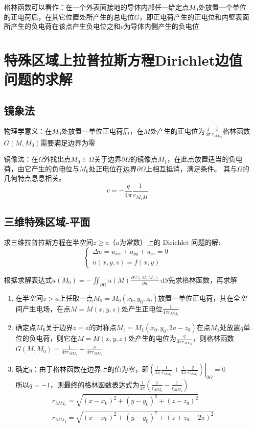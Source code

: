 格林函数可以看作：在一个外表面接地的导体内部任一给定点\(M_0\)处放置一个单位的正电荷后，在其它位置处所产生的总电位\(G\)，即正电荷产生的正电位和内壁表面所产生的负电荷在该点产生负电位之和\(v\)为导体内侧产生的负电位

\section{特殊区域上拉普拉斯方程Dirichlet边值问题的求解}

\subsection{镜象法}

物理学意义：在\(M_0\)处放置一单位正电荷后，在\(M\)处产生的正电位为\(\frac{1}{4\pi}\frac{1}{r_{MM_0}}\)格林函数\(G(M,M_0)\)需要满足边界为零

镜像法：在\(\Omega\)外找出点\(M_0\in\Omega\)关于边界\(\partial\Omega\)的镜像点\(M_1\)，在此点放置适当的负电荷，由它产生的负电位与\(M_0\)处正电位在边界\(\partial\Omega\)上相互抵消，满足条件。 其与\(\Omega\)的几何特点息息相关。
\[
v=-\frac{q}{4\pi}\frac{1}{r_{M_1M}}
\]

\subsection{三维特殊区域-平面}

求三维拉普拉斯方程在半空间\(z\geq a\)（\(a\)为常数）上的 Dirichlet 问题的解:
\[\begin{cases}
\Delta u=u_{xx}+u_{yy}+u_{zz}=0\\
u(x,y,z)=f(x,y)
\end{cases}\]

根据求解表达式\(u(M_0)=-\iint_{\partial\Omega} u(M)\frac{\partial G(M,M_0)}{\partial n}\,\mathrm{d}S\)先求格林函数，再求解
\begin{enumerate}
	\item 在半空间\(z>a\)上任取一点\(M_0=M_0(x_0,y_0,z_0)\)放置一单位正电荷，其在全空间产生电场，在点\(M=M(x,y,z)\)处产生正电位\(\frac{1}{4\pi  r_{MM_0}}\)
	\item 确定点\(M_0\)关于边界\(z=a\)的对称点\(M_1=M_1(x_0,y_0,2a-z_0)\)在点\(M_1\)处放置\(q\)单位的负电荷，则它在\(M=M(x,y,z)\)处产生的电位为\(\frac{q}{4\pi  r_{MM_0}}\)，则格林函数\(G(M,M_0)=\frac{1}{4\pi  r_{MM_0}}+\frac{q}{4\pi  r_{MM_1}}\)
	\item 确定\(q\)：由于格林函数在边界上的值为零，即\(\left.\left(\frac{1}{4\pi}\frac{1}{r_{MM_0}}+\frac{1}{4\pi}\frac{q}{r_{MM_1}}\right)\right|_{\partial\Omega}=0\)\\
	所以\(q=-1\)，则最终的格林函数表达式为\(\frac{1}{4\pi}\left(\frac{1}{r_{MM_0}}-\frac{1}{r_{MM_1}}\right)\)
	\begin{gather*}r_{MM_0}=\sqrt{(x-x_0)^2+(y-y_0)^2+(z-z_0)^2}\\r_{MM_1}=\sqrt{(x-x_0)^2+(y-y_0)^2+(z+z_0-2a)^2}\end{gather*}
\end{enumerate}


